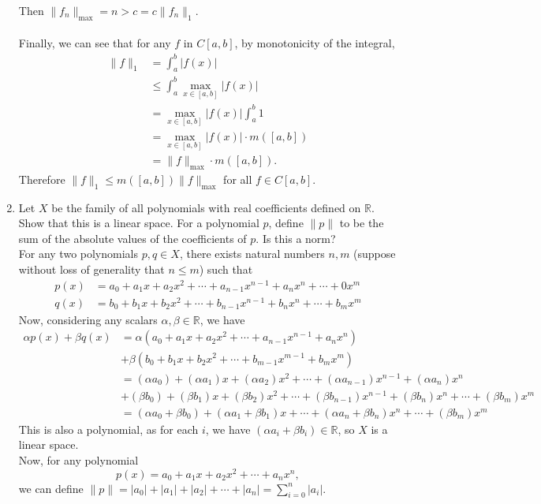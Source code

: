 \begin{enumerate}
	Then $\| f_n \|_{\max}=n > c =  c \| f_n\|_1$.\\
	\\
	Finally, we can see that for any $f$ in $C[a,b]$, by monotonicity of the integral, 
	\begin{align*}
	\|f\|_1 &= \int_a^b|f(x)|\\ 
	&\le \int_a^b\max_{x\in [a,b]}|f(x)|\\
	&=\max_{x\in [a,b]}|f(x)| \int_a^b1\\
	&= \max_{x\in [a,b]}|f(x)| \cdot m([a,b]) \\
	&= \|f\|_{\max} \cdot m([a,b]).
	\end{align*}
	Therefore $\|f\|_1\le m([a,b])\|f\|_{\max}$ for all $f\in C[a,b]$.
	\item Let $X$ be the family of all polynomials with real coefficients defined on $\mathbb{R}$.
	Show that this is a linear space. For a polynomial $p$, define $\| p\|$ to be the sum of the absolute values of the coefficients of $p$.
	Is this a norm?\\
	For any two polynomials $p,q\in X$, there exists natural numbers $n,m$ (suppose without loss of generality that $n\le m$) such that
	\begin{align*}
	p(x) &= a_0+a_1x+a_2x^2+\cdots+a_{n-1}x^{n-1}+a_nx^n+\cdots+0x^m	\\
	q(x) &= b_0+b_1x+b_2x^2+\cdots+b_{n-1}x^{n-1}+b_nx^n+\cdots+b_mx^m	
	\end{align*}
	Now, considering any scalars $\alpha,\beta \in \mathbb{R}$, we have
	\begin{align*}
		\alpha p(x) + \beta q(x) &= \alpha (a_0+a_1x+a_2x^2+\cdots+a_{n-1}x^{n-1}+a_nx^n)\\
		&+ \beta (b_0+b_1x+b_2x^2+\cdots+b_{m-1}x^{m-1}+b_mx^m)\\
		&=(\alpha a_0)+(\alpha a_1)x+(\alpha a_2)x^2+\cdots+(\alpha a_{n-1})x^{n-1}+(\alpha a_n)x^n\\
		&+ (\beta b_0)+(\beta b_1)x+(\beta b_2)x^2+\cdots+(\beta b_{n-1})x^{n-1}+(\beta b_n)x^n+\cdots+(\beta b_m)x^m\\
		&=(\alpha a_0+\beta b_0)+(\alpha a_1+\beta b_1)x+\cdots+(\alpha a_n+\beta b_n)x^n+\cdots+(\beta b_m)x^m
	\end{align*}
	This is also a polynomial, as for each $i$, we have $(\alpha a_i+\beta b_i) \in \mathbb{R}$, so $X$ is a linear space.\\
	Now, for any polynomial
	\[
		p(x) = a_0+a_1x+a_2x^2+\cdots+a_nx^n,	
	\]
	we can define $\|p\| = |a_0|+|a_1|+|a_2|+\cdots+|a_n| = \sum_{i=0}^n|a_i|$.\\

\end{enumerate}
